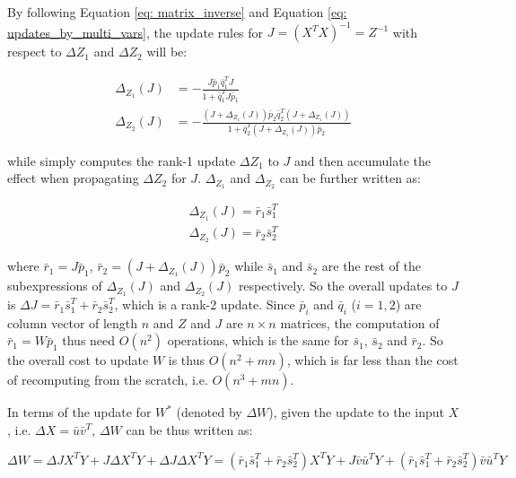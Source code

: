 By following Equation \ref{eq: matrix_inverse} and Equation \ref{eq: updates_by_multi_vars}, the update rules for $J = (X^TX)^{-1} = Z^{-1}$ with respect to $\Delta Z_1$ and $\Delta Z_2$ will be:

\begin{center}
\begin{equation}
\begin{split}
    \Delta_{Z_1}(J)& = -\frac{J\bar{p}_1\bar{q}_1^TJ}{1 + \bar{q}_1^TJ\bar{p}_1}\\
    \Delta_{Z_2}(J)& = -\frac{(J+\Delta_{Z_1}(J))\bar{p}_2\bar{q}_2^T(J+\Delta_{Z_1}(J))}{1 + \bar{q}_2^T(J+\Delta_{Z_1}(J))\bar{p}_2}
\end{split}   
\end{equation}
\end{center}

while simply computes the rank-1 update $\Delta Z_1$ to $J$ and then accumulate the effect when propagating $\Delta Z_2$ for $J$. $\Delta_{Z_1}$ and $\Delta_{Z_2}$ can be further written as:

\begin{equation}
\begin{split}
\Delta_{Z_1}(J) = \bar{r}_1\bar{s}_1^T\\    
\Delta_{Z_2}(J) = \bar{r}_2\bar{s}_2^T
\end{split}
\end{equation}

where $\bar{r}_1 = J\bar{p}_1$, $\bar{r}_2 = (J+\Delta_{Z_1}(J))\bar{p}_2$ while $\bar{s}_1$ and $\bar{s}_2$ are the rest of the subexpressions of $\Delta_{Z_1}(J)$ and $\Delta_{Z_2}(J)$ respectively. So the overall updates to $J$ is $\Delta J = \bar{r}_1\bar{s}_1^T + \bar{r}_2\bar{s}_2^T$, which is a rank-2 update.
Since $\bar{p}_i$ and $\bar{q}_i$ ($i=1,2$) are column vector of length $n$ and $Z$ and $J$ are $n \times n$ matrices, the computation of $\bar{r}_1 = W\bar{p}_1$ thus need $O(n^2)$ operations, which is the same for $\bar{s}_1$, $\bar{s}_2$ and $\bar{r}_2$. So the overall cost to update $W$ is thus $O(n^2 + mn)$, which is far less than the cost of recomputing from the scratch, i.e. $O(n^3 + mn)$.

In terms of the update for $W^*$ (denoted by $\Delta W$), given the update to the input $X$, i.e. $\Delta X=\bar{u}\bar{v}^T$, $\Delta W$ can be thus written as:

\begin{equation}
    \Delta W = \Delta JX^TY + J\Delta X^TY + \Delta J\Delta X^TY = (\bar{r}_1\bar{s}_1^T + \bar{r}_2\bar{s}_2^T)X^TY + J\bar{v}\bar{u}^TY + (\bar{r}_1\bar{s}_1^T + \bar{r}_2\bar{s}_2^T)\bar{v}\bar{u}^TY
\end{equation}


